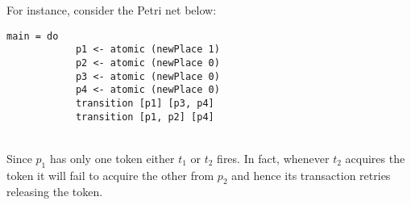 For instance, consider the Petri net below:
\\
\noindent
\begin{BVerbatim}[tabsize=3, xleftmargin=1ex, gobble=2]
        main = do
            p1 <- atomic (newPlace 1)
            p2 <- atomic (newPlace 0)
            p3 <- atomic (newPlace 0)
            p4 <- atomic (newPlace 0)
            transition [p1] [p3, p4]
            transition [p1, p2] [p4]
\end{BVerbatim}
\hfill
\begin{minipage}[t]{.33\linewidth}
\end{minipage}
\\[1ex]
Since $p_1$ has only one token either $t_1$ or $t_2$ fires. In fact,
whenever $t_2$ acquires the token it will fail to acquire the other
from $p_2$ and hence its transaction retries releasing the token.
